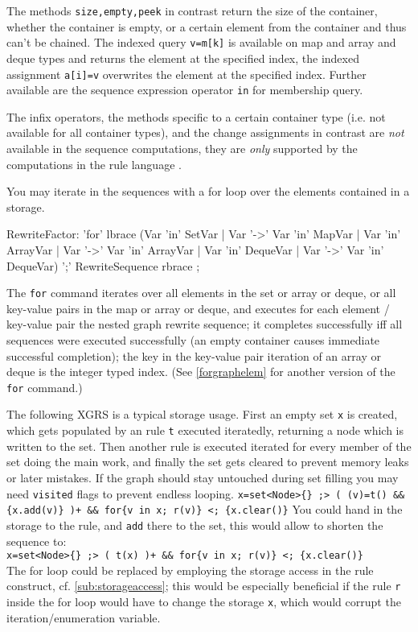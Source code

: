 The methods \texttt{size,empty,peek} in contrast return the size of the container, whether the container is empty, or a certain element from the container and thus can't be chained.
The indexed query \texttt{v=m[k]} is available on map and array and deque types and returns the element at the specified index,
the indexed assignment \texttt{a[i]=v} overwrites the element at the specified index.
Further available are the sequence expression operator \texttt{in} for membership query.

The infix operators, the methods specific to a certain container type (i.e. not available for all container types), and the change assignments in contrast are \emph{not} available in the sequence computations, they are \emph{only} supported by the computations in the rule language .

You may iterate in the sequences with a for loop over the elements contained in a storage.

\begin{rail}
  RewriteFactor:
    'for' lbrace (Var 'in' SetVar | Var '->' Var 'in' MapVar | Var 'in' ArrayVar | Var '->' Var 'in' ArrayVar | Var 'in' DequeVar | Var '->' Var 'in' DequeVar) ';' RewriteSequence rbrace
    ;
\end{rail}\label{forstorage}

The \texttt{for} command iterates over all elements in the set or array or deque, or all key-value pairs in the map or array or deque, and executes for each element / key-value pair the nested graph rewrite sequence; it completes successfully iff all sequences were executed successfully (an empty container causes immediate successful completion); the key in the key-value pair iteration of an array or deque is the integer typed index. (See \ref{forgraphelem} for another version of the \texttt{for} command.)

\begin{example}
The following XGRS is a typical storage usage.
First an empty set \texttt{x} is created, which gets populated by an rule \texttt{t} executed iteratedly, returning a node which is written to the set.
Then another rule is executed iterated for every member of the set doing the main work, and finally the set gets cleared to prevent memory leaks or later mistakes.
If the graph should stay untouched during set filling you may need \texttt{visited} flags to prevent endless looping.
\verb#x=set<Node>{} ;> ( (v)=t() && {x.add(v)} )+ && for{v in x; r(v)} <; {x.clear()}#
You could hand in the storage to the rule, and \texttt{add} there to the set, this would allow to shorten the sequence to:\\
\verb#x=set<Node>{} ;> ( t(x) )+ && for{v in x; r(v)} <; {x.clear()}#\\
The for loop could be replaced by employing the storage access in the rule construct, cf. \ref{sub:storageaccess}; this would be especially beneficial if the rule \texttt{r} inside the for loop would have to change the storage \texttt{x}, which would corrupt the iteration/enumeration variable.
\end{example}

